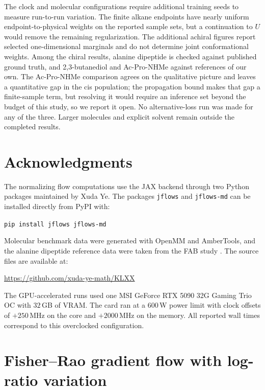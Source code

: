 \documentclass{article}
\begin{document}
The clock and molecular configurations require additional training seeds to measure run-to-run variation. The finite alkane endpoints have nearly uniform endpoint-to-physical weights on the reported sample sets, but a continuation to $U$ would remove the remaining regularization. The additional achiral figures report selected one-dimensional marginals and do not determine joint conformational weights. Among the chiral results, alanine dipeptide is checked against published ground truth, and 2,3-butanediol and Ac-Pro-NHMe against references of our own. The Ac-Pro-NHMe comparison agrees on the qualitative picture and leaves a quantitative gap in the cis population; the propagation bound makes that gap a finite-sample term, but resolving it would require an inference set beyond the budget of this study, so we report it open. No alternative-loss run was made for any of the three. Larger molecules and explicit solvent remain outside the completed results.


\section*{Acknowledgments}

The normalizing flow computations use the JAX backend through two Python packages maintained by Xuda Ye. The packages \texttt{jflows} and \texttt{jflows-md} can be installed directly from PyPI with:
\begin{tcolorbox}[colback=gray!12,boxrule=0pt,arc=2pt,left=6pt,right=6pt,top=4pt,bottom=4pt]
\texttt{pip install jflows jflows-md}
\end{tcolorbox}
\noindent
Molecular benchmark data were generated with OpenMM and AmberTools, and the alanine dipeptide reference data were taken from the FAB study \citep{midgley2022flow}. The source files are available at:
\begin{tcolorbox}[colback=gray!12,boxrule=0pt,arc=2pt,left=6pt,right=6pt,top=4pt,bottom=4pt]
\url{https://github.com/xuda-ye-math/KLXX}
\end{tcolorbox}
\noindent
The GPU-accelerated runs used one MSI GeForce RTX 5090 32G Gaming Trio OC with $32$\,GB of VRAM. The card ran at a $600$\,W power
limit with clock offsets of $+250$\,MHz on the core and $+2000$\,MHz on the
memory. All reported wall times correspond to this overclocked
configuration.

\clearpage
\appendix

\section{Fisher--Rao gradient flow with log-ratio variation}
\label{sec: appendix-FR}
\end{document}
